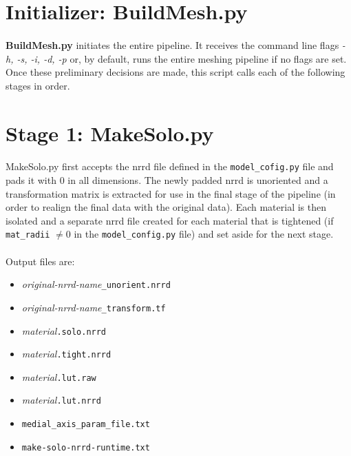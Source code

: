\documentclass[fleqn,12pt,openany]{book}
\begin{document}
\section{Initializer: BuildMesh.py}

\paragraph{}
{\bf BuildMesh.py} initiates the entire pipeline.  
It receives the command line flags \emph{-h, -s, -i, -d, -p} or, by default, 
runs the entire meshing pipeline if no flags are set.
Once these preliminary decisions are made, this script calls each of the following stages in order.

\section{Stage 1: MakeSolo.py}

\paragraph{}
MakeSolo.py first accepts the nrrd file defined in the \verb+model_cofig.py+ 
file and pads it with 0 in all dimensions.
The newly padded nrrd is unoriented and a transformation matrix is extracted for use in the final 
stage of the pipeline (in order to realign the final data with the original data).
Each material is then isolated and a separate nrrd file created for 
each material that is tightened (if \verb+mat_radii+ $\neq 0$ in the \verb+model_config.py+ 
file) and set aside for the next stage.   \\ \\
Output files are:

\begin{itemize}

\item{\emph{original-nrrd-name}\verb+_unorient.nrrd+}
\item{\emph{original-nrrd-name}\verb+_transform.tf+}
\item{\emph{material}\verb+.solo.nrrd+}
\item{\emph{material}\verb+.tight.nrrd+}
\item{\emph{material}\verb+.lut.raw+}
\item{\emph{material}\verb+.lut.nrrd+}
\item{\verb+medial_axis_param_file.txt+}
\item{\verb+make-solo-nrrd-runtime.txt+}

\end{itemize}
\end{document}
